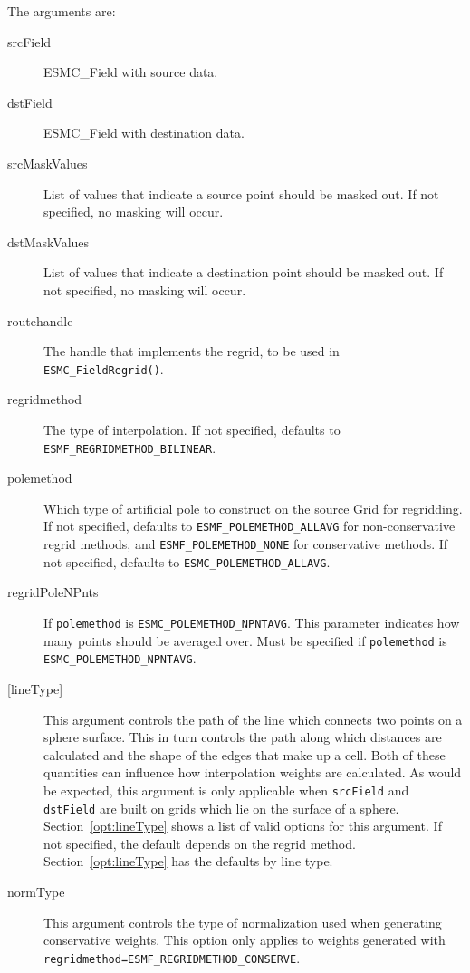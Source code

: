     The arguments are:
    \begin{description}
    \item[srcField]
      ESMC\_Field with source data.
    \item[dstField]
      ESMC\_Field with destination data.
    \item[srcMaskValues]
      List of values that indicate a source point should be masked out. 
      If not specified, no masking will occur.
    \item[dstMaskValues]
      List of values that indicate a destination point should be masked out. 
      If not specified, no masking will occur.
    \item[routehandle]
      The handle that implements the regrid, to be used in {\tt ESMC\_FieldRegrid()}.
    \item[regridmethod]
      The type of interpolation. If not specified, defaults to {\tt ESMF\_REGRIDMETHOD\_BILINEAR}.
    \item [polemethod]
      Which type of artificial pole
      to construct on the source Grid for regridding. 
      If not specified, defaults to {\tt ESMF\_POLEMETHOD\_ALLAVG} for non-conservative regrid methods, 
      and {\tt ESMF\_POLEMETHOD\_NONE} for conservative methods. 
      If not specified, defaults to {\tt ESMC\_POLEMETHOD\_ALLAVG}. 
    \item [regridPoleNPnts]
      If {\tt polemethod} is {\tt ESMC\_POLEMETHOD\_NPNTAVG}.
      This parameter indicates how many points should be averaged
      over. Must be specified if {\tt polemethod} is 
      {\tt ESMC\_POLEMETHOD\_NPNTAVG}.
    \item [{[lineType]}]
      This argument controls the path of the line which connects two points on a sphere surface. This in
      turn controls the path along which distances are calculated and the shape of the edges that make
      up a cell. Both of these quantities can influence how interpolation weights are calculated.
      As would be expected, this argument is only applicable when {\tt srcField} and {\tt dstField} are
      built on grids which lie on the surface of a sphere. Section~\ref{opt:lineType} shows a
      list of valid options for this argument. If not specified, the default depends on the
      regrid method. Section~\ref{opt:lineType} has the defaults by line type.
    \item[normType]
      This argument controls the type of normalization used when generating conservative weights.
      This option only applies to weights generated with {\tt regridmethod=ESMF\_REGRIDMETHOD\_CONSERVE}.

\end{description}
